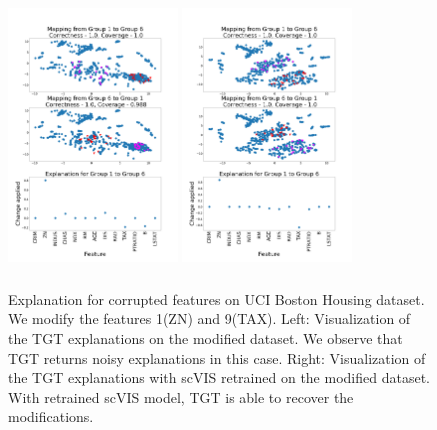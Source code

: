 \begin{figure}[H]
\centering
    \includegraphics[width=0.4\textwidth, height=7.2cm]{../openreview/images/tffigures/housing-t2c.png}
    \includegraphics[width=0.4\textwidth, height=7.2cm]{../openreview/images/tffigures/housing-retrained-t2c.png}
    \caption{Explanation for corrupted features on UCI Boston Housing dataset. We modify the features 1(ZN) and 9(TAX). Left: Visualization of the TGT explanations on the modified dataset. We observe that TGT returns noisy explanations in this case. Right: Visualization of the TGT explanations with scVIS retrained on the modified dataset. With retrained scVIS model, TGT is able to recover the modifications.}
    \label{fig:t2c-Housing}
\end{figure}
